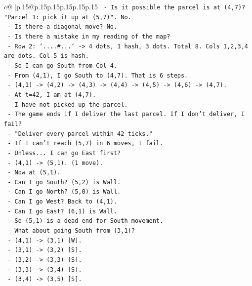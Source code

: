 \documentclass{article}
\begin{document}
{\begin{supertabular}{c@{$\;$}|p{.15\linewidth}@{}p{.15\linewidth}p{.15\linewidth}p{.15\linewidth}p{.15\linewidth}p{.15\linewidth}}
{{{\texttt{     {-} Is it possible the parcel is at (4,7)? "Parcel 1: pick it up at (5,7)". No.} \\
\texttt{   {-} Is there a diagonal move? No.} \\
\texttt{   {-} Is there a mistake in my reading of the map?} \\
\texttt{     {-} Row 2: `....\#...` {-}> 4 dots, 1 hash, 3 dots. Total 8. Cols 1,2,3,4 are dots. Col 5 is hash.} \\
\texttt{     {-} So I can go South from Col 4.} \\
\texttt{     {-} From (4,1), I go South to (4,7). That is 6 steps.} \\
\texttt{     {-} (4,1) {-}> (4,2) {-}> (4,3) {-}> (4,4) {-}> (4,5) {-}> (4,6) {-}> (4,7).} \\
\texttt{     {-} At t=42, I am at (4,7).} \\
\texttt{     {-} I have not picked up the parcel.} \\
\texttt{     {-} The game ends if I deliver the last parcel. If I don't deliver, I fail?} \\
\texttt{     {-} "Deliver every parcel within 42 ticks."} \\
\texttt{     {-} If I can't reach (5,7) in 6 moves, I fail.} \\
\texttt{     {-} Unless... I can go East first?} \\
\texttt{       {-} (4,1) {-}> (5,1). (1 move).} \\
\texttt{       {-} Now at (5,1).} \\
\texttt{       {-} Can I go South? (5,2) is Wall.} \\
\texttt{       {-} Can I go North? (5,0) is Wall.} \\
\texttt{       {-} Can I go West? Back to (4,1).} \\
\texttt{       {-} Can I go East? (6,1) is Wall.} \\
\texttt{       {-} So (5,1) is a dead end for South movement.} \\
\texttt{     {-} What about going South from (3,1)?} \\
\texttt{       {-} (4,1) {-}> (3,1) {[}W{]}.} \\
\texttt{       {-} (3,1) {-}> (3,2) {[}S{]}.} \\
\texttt{       {-} (3,2) {-}> (3,3) {[}S{]}.} \\
\texttt{       {-} (3,3) {-}> (3,4) {[}S{]}.} \\
\texttt{       {-} (3,4) {-}> (3,5) {[}S{]}.} \\
}}}
\end{supertabular}}
\end{document}
